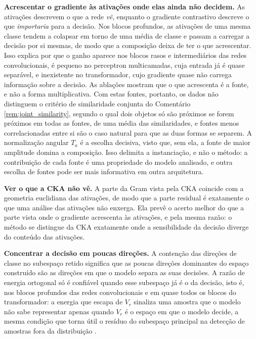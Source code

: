 \textbf{Acrescentar o gradiente às ativações onde elas ainda não decidem.} As ativações descrevem o que a rede \textit{vê}, enquanto o gradiente contrastivo descreve o que \textit{importaria} para a decisão. Nos blocos profundos, as ativações de uma mesma classe tendem a colapsar em torno de uma média de classe \citep{Papyan2020} e passam a carregar a decisão por si mesmas, de modo que a composição deixa de ter o que acrescentar. Isso explica por que o ganho aparece nos blocos rasos e intermediários das redes convolucionais, é pequeno no perceptron multicamadas, cuja entrada já é quase separável, e inexistente no transformador, cujo gradiente quase não carrega informação sobre a decisão. As ablações mostram que o que acrescenta é a fonte, e não a forma multiplicativa. Com estas fontes, portanto, os dados não distinguem o critério de similaridade conjunta do Comentário \ref{rem:joint_similarity}, segundo o qual dois objetos só são próximos se forem próximos em todas as fontes, de uma média das similaridades, e fontes menos correlacionadas entre si são o caso natural para que as duas formas se separem. A normalização angular $T_a$ é a escolha decisiva, visto que, sem ela, a fonte de maior amplitude domina a composição. Isso delimita a instanciação, e não o método: a contribuição de cada fonte é uma propriedade do modelo analisado, e outra escolha de fontes pode ser mais informativa em outra arquitetura.

\textbf{Ver o que a CKA não vê.} A parte da Gram vista pela CKA coincide com a geometria euclidiana das ativações, de modo que a parte residual é exatamente o que uma análise das ativações não enxerga. Ela prevê o acerto melhor do que a parte vista onde o gradiente acrescenta às ativações, e pela mesma razão: o método se distingue da CKA exatamente onde a sensibilidade da decisão diverge do conteúdo das ativações.

\textbf{Concentrar a decisão em poucas direções.} A contenção das direções de classe no subespaço retido significa que as poucas direções dominantes do espaço construído são as direções em que o modelo separa as suas decisões. A razão de energia ortogonal só é confiável quando esse subespaço já é o da decisão, isto é, nos blocos profundos das redes convolucionais e em quase todos os blocos do transformador: a energia que escapa de $V_r$ sinaliza uma amostra que o modelo não sabe representar apenas quando $V_r$ é o espaço em que o modelo decide, a mesma condição que torna útil o resíduo do subespaço principal na detecção de amostras fora da distribuição \citep{Wang2022ViM}.

